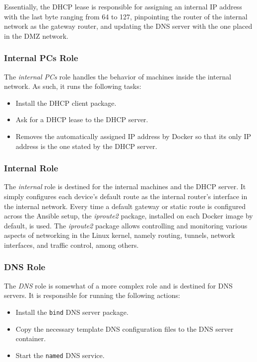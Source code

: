 Essentially, the DHCP lease is responsible for assigning an internal IP address with the last byte ranging from 64 to 127, pinpointing the router of the internal network as the gateway router, and updating the DNS server with the one placed in the DMZ network.

\subsubsection{Internal PCs Role} \label{sec:ansible_internal_pcs_role}

The \textit{internal PCs} role handles the behavior of machines inside the internal network. As such, it runs the following tasks:

\begin{itemize}
    \item Install the DHCP client package.
    \item Ask for a DHCP lease to the DHCP server.
    \item Removes the automatically assigned IP address by Docker so that its only IP address is the one stated by the DHCP server.
\end{itemize}

\subsubsection{Internal Role} \label{sec:ansible_internal_role}

The \textit{internal} role is destined for the internal machines and the DHCP server. It simply configures each device's default route as the internal router's interface in the internal network. Every time a default gateway or static route is configured across the Ansible setup, the \textit{iproute2} package, installed on each Docker image by default, is used. The \textit{iproute2} package allows controlling and monitoring various aspects of networking in the Linux kernel, namely routing, tunnels, network interfaces, and traffic control, among others.

\subsubsection{DNS Role} \label{sec:ansible_dns_role}

The \textit{DNS} role is somewhat of a more complex role and is destined for DNS servers. It is responsible for running the following actions:

\begin{itemize}
    \item Install the \texttt{bind} DNS server package.
    \item Copy the necessary template DNS configuration files to the DNS server container.
    \item Start the \texttt{named} DNS service.
\end{itemize}

